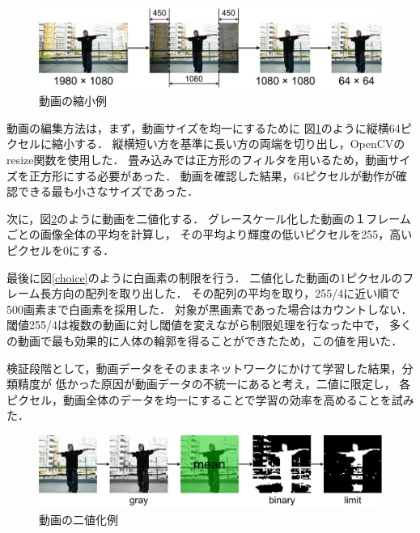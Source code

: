 \begin{figure}[t]
  \begin{center}
    \includegraphics[width=120mm]{images/chart/resize.pdf}
  \end{center}
  \caption{動画の縮小例}
  \label{resize}
\end{figure}

動画の編集方法は，まず，動画サイズを均一にするために
図\ref{resize}のように縦横64ピクセルに縮小する．
縦横短い方を基準に長い方の両端を切り出し，OpenCVのresize関数\cite{resize}を使用した．
畳み込みでは正方形のフィルタを用いるため，動画サイズを正方形にする必要があった．
動画を確認した結果，64ピクセルが動作が確認できる最も小さなサイズであった．

次に，図\ref{binary}のように動画を二値化する．
グレースケール化した動画の１フレームごとの画像全体の平均を計算し，
その平均より輝度の低いピクセルを255，高いピクセルを0にする．

最後に図\ref{choice}のように白画素の制限を行う．
二値化した動画の1ピクセルのフレーム長方向の配列を取り出した．
その配列の平均を取り，255/4に近い順で500画素まで白画素を採用した．
対象が黒画素であった場合はカウントしない．
閾値255/4は複数の動画に対し閾値を変えながら制限処理を行なった中で，
多くの動画で最も効果的に人体の輪郭を得ることができたため，この値を用いた．

検証段階として，動画データをそのままネットワークにかけて学習した結果，分類精度が
低かった原因が動画データの不統一にあると考え，二値に限定し，
各ピクセル，動画全体のデータを均一にすることで学習の効率を高めることを試みた．

\begin{figure}[b]
  \begin{center}
    \includegraphics[width=120mm]{images/chart/binary.pdf}
  \end{center}
  \caption{動画の二値化例}
  \label{binary}
\end{figure}
\clearpage

